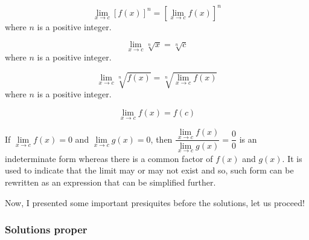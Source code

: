\documentclass[10pt,paper=letter]{scrartcl}
\begin{document}
\begin{mdframed}[style=jremmdbox, frametitle = Some important presiquites]
\begin{theorem} $$\displaystyle \mathop {\lim }\limits_{x \rightarrow c} {[f(x)]^n} = [\displaystyle \mathop {\lim }\limits_{x \rightarrow c} f(x)]^n$$ where $n$ is a positive integer.

\end{theorem}

\begin{theorem} $$\displaystyle \mathop {\lim }\limits_{x \rightarrow c} {\sqrt[n]{x}} = \sqrt[n]{c}$$ where $n$ is a positive integer.

\end{theorem}

\begin{theorem} $$\displaystyle \mathop {\lim }\limits_{x \rightarrow c} {\sqrt[n]{f(x)}} = \sqrt[n]{\displaystyle \mathop {\lim }\limits_{x \rightarrow c} f(x)}$$ where $n$ is a positive integer.

\end{theorem}

\begin{theorem}

$$\displaystyle \mathop {\lim }\limits_{x \rightarrow c} f(x) = f(c)$$

\end{theorem}

\begin{theorem}

If $\displaystyle \mathop {\lim }\limits_{x \rightarrow c} f(x) = 0$ and $\displaystyle \mathop {\lim }\limits_{x \rightarrow c} g(x) = 0$, then $\dfrac{\displaystyle \mathop {\lim }\limits_{x \rightarrow c} f(x)}{\displaystyle \mathop {\lim }\limits_{x \rightarrow c} g(x)} = \dfrac{0}{0}$ is an indeterminate form whereas there is a common factor of $f(x)$ and $g(x).$ It is used to indicate that the limit may or may not exist and so, such form can be rewritten as an expression that can be simplified further. 

\end{theorem}
\end{mdframed}

Now, I presented some important presiquites before the solutions, let us proceed!

\subsubsection*{Solutions proper}
\end{document}
